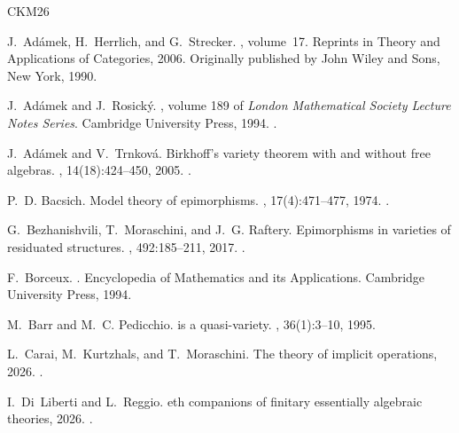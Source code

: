 \documentclass[a4paper,10pt,reqno]{amsart}
\theoremstyle{definition}
\theoremstyle{remark}
\begin{document}

\begin{thebibliography}{CKM26}

J.~Ad{\'a}mek, H.~Herrlich, and G.~Strecker.
, volume~17.
\newblock Reprints in Theory and Applications of Categories, 2006.
\newblock Originally published by John Wiley and Sons, New York, 1990.

J.~Ad{\'a}mek and J.~Rosick{\'y}.
, volume 189 of
  {\em London Mathematical Society Lecture Notes Series}.
\newblock Cambridge University Press, 1994.
\newblock \href {https://doi.org/10.1017/CBO9780511600579}
  {}.

J.~Ad\'amek and V.~Trnkov{\'a}.
\newblock Birkhoff's variety theorem with and without free algebras.
, 14(18):424--450, 2005.
\newblock \href {https://doi.org/10.70930/tac/kxsbnt6z}
  {}.

P.~D. Bacsich.
\newblock Model theory of epimorphisms.
, 17(4):471--477, 1974.
\newblock \href {https://doi.org/10.4153/CMB-1974-083-6}
  {}.

G.~Bezhanishvili, T.~Moraschini, and J.~G. Raftery.
\newblock Epimorphisms in varieties of residuated structures.
, 492:185--211, 2017.
\newblock \href {https://doi.org/10.1016/j.jalgebra.2017.08.023}
  {}.

F.~Borceux.
.
\newblock Encyclopedia of Mathematics and its Applications. Cambridge
  University Press, 1994.

M.~Barr and M.~C. Pedicchio.
 is a quasi-variety.
,
  36(1):3--10, 1995.

L.~Carai, M.~Kurtzhals, and T.~Moraschini.
\newblock The theory of implicit operations, 2026.
\newblock \href {https://arxiv.org/abs/2512.14326} {}.

I.~Di~Liberti and L.~Reggio.
eth companions of finitary essentially algebraic theories, 2026.
\newblock \href {https://arxiv.org/abs/2609.03601} {}.


\end{thebibliography}
\end{document}
